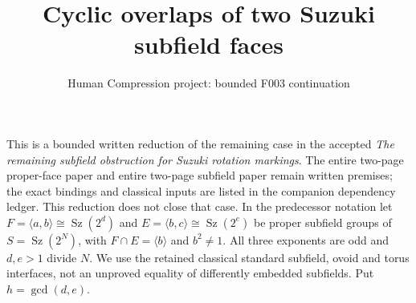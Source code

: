 \documentclass[11pt,a4paper]{article}
\title{Cyclic overlaps of two Suzuki subfield faces}
\author{Human Compression project: bounded F003 continuation}\date{}
\newcommand{\Sz}{\operatorname{Sz}}
\begin{document}
\maketitle
This is a bounded written reduction of the remaining case in the accepted
\emph{The remaining subfield obstruction for Suzuki rotation markings}.
The entire two-page proper-face paper and entire two-page subfield paper
remain written premises; the exact bindings and classical inputs are
listed in the companion dependency ledger. This reduction does not close
that case. In the predecessor notation let
$F=\langle a,b\rangle\cong\Sz(2^d)$ and
$E=\langle b,c\rangle\cong\Sz(2^e)$ be proper subfield groups of
$S=\Sz(2^N)$, with $F\cap E=\langle b\rangle$ and $b^2\ne1$.
All three exponents are odd and $d,e>1$ divide $N$.
We use the retained classical standard subfield, ovoid and torus
interfaces, not an unproved equality of differently embedded subfields.
Put $h=\gcd(d,e)$.
\end{document}
